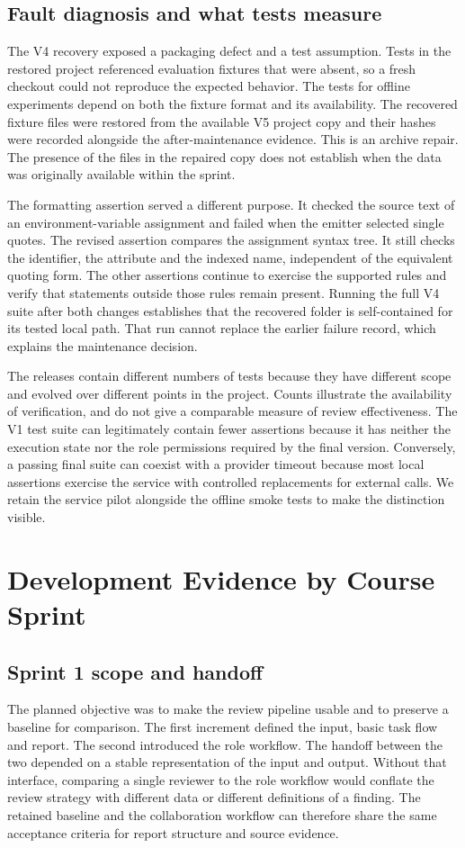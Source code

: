 \documentclass[journal,compsoc]{IEEEtran}
\begin{document}
\subsection{Fault diagnosis and what tests measure}
The V4 recovery exposed a packaging defect and a test assumption. Tests in the restored project referenced evaluation fixtures that were absent, so a fresh checkout could not reproduce the expected behavior. The tests for offline experiments depend on both the fixture format and its availability. The recovered fixture files were restored from the available V5 project copy and their hashes were recorded alongside the after-maintenance evidence. This is an archive repair. The presence of the files in the repaired copy does not establish when the data was originally available within the sprint.

The formatting assertion served a different purpose. It checked the source text of an environment-variable assignment and failed when the emitter selected single quotes. The revised assertion compares the assignment syntax tree. It still checks the identifier, the attribute and the indexed name, independent of the equivalent quoting form. The other assertions continue to exercise the supported rules and verify that statements outside those rules remain present. Running the full V4 suite after both changes establishes that the recovered folder is self-contained for its tested local path. That run cannot replace the earlier failure record, which explains the maintenance decision.

The releases contain different numbers of tests because they have different scope and evolved over different points in the project. Counts illustrate the availability of verification, and do not give a comparable measure of review effectiveness. The V1 test suite can legitimately contain fewer assertions because it has neither the execution state nor the role permissions required by the final version. Conversely, a passing final suite can coexist with a provider timeout because most local assertions exercise the service with controlled replacements for external calls. We retain the service pilot alongside the offline smoke tests to make the distinction visible.

\section{Development Evidence by Course Sprint}
\subsection{Sprint 1 scope and handoff}
The planned objective was to make the review pipeline usable and to preserve a baseline for comparison. The first increment defined the input, basic task flow and report. The second introduced the role workflow. The handoff between the two depended on a stable representation of the input and output. Without that interface, comparing a single reviewer to the role workflow would conflate the review strategy with different data or different definitions of a finding. The retained baseline and the collaboration workflow can therefore share the same acceptance criteria for report structure and source evidence.
\end{document}
